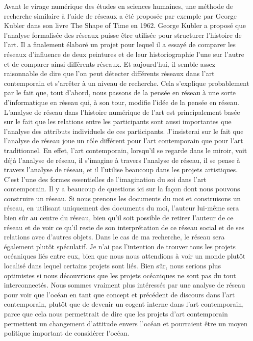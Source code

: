 \documentclass[a4paper, twoside, 12pt]{book}
\begin{document}
Avant le virage numérique des études en sciences humaines, une méthode de recherche similaire à l'aide de réseaux a été proposée par exemple par George Kubler dans son livre The Shape of Time en 1962. George Kubler a proposé que l'analyse formalisée des réseaux puisse être utilisée pour structurer l'histoire de l'art. Il a finalement élaboré un projet pour lequel il a essayé de comparer les réseaux d'influence de deux peintures et de leur historiographie l'une sur l'autre et de comparer ainsi différents réseaux. Et aujourd'hui, il semble assez raisonnable de dire que l'on peut détecter différents réseaux dans l'art contemporain et s'arrêter à un niveau de recherche. Cela s'explique probablement par le fait que, tout d'abord, nous passons de la pensée en réseau à une sorte d'informatique en réseau qui, à son tour, modifie l'idée de la pensée en réseau. L'analyse de réseau dans l'histoire numérique de l'art est principalement basée sur le fait que les relations entre les participants sont aussi importantes que l'analyse des attributs individuels de ces participants. J'insisterai sur le fait que l'analyse de réseau joue un rôle différent pour l'art contemporain que pour l'art traditionnel. En effet, l'art contemporain, lorsqu'il se regarde dans le miroir, voit déjà l'analyse de réseau, il s'imagine à travers l'analyse de réseau, il se pense à travers l'analyse de réseau, et il l'utilise beaucoup dans les projets artistiques. C'est l'une des formes essentielles de l'imagination du soi dans l'art contemporain. Il y a beaucoup de questions ici sur la façon dont nous pouvons construire un réseau. Si nous prenons les documents du moi et construisons un réseau, en utilisant uniquement des documents du moi, l'auteur lui-même sera bien sûr au centre du réseau, bien qu'il soit possible de retirer l'auteur de ce réseau et de voir ce qu'il reste de son interprétation de ce réseau social et de ses relations avec d'autres objets. Dans le cas de ma recherche, le réseau sera également plutôt spéculatif. Je n'ai pas l'intention de trouver tous les projets océaniques liés entre eux, bien que nous nous attendions à voir un monde plutôt localisé dans lequel certains projets sont liés. Bien sûr, nous serions plus optimistes si nous découvrions que les projets océaniques ne sont pas du tout interconnectés. Nous sommes vraiment plus intéressés par une analyse de réseau pour voir que l'océan en tant que concept et précédent de discours dans l'art contemporain, plutôt que de devenir un cogent interne dans l'art contemporain, parce que cela nous permettrait de dire que les projets d'art contemporain permettent un changement d'attitude envers l'océan et pourraient être un moyen politique important de considérer l'océan.
\end{document}
